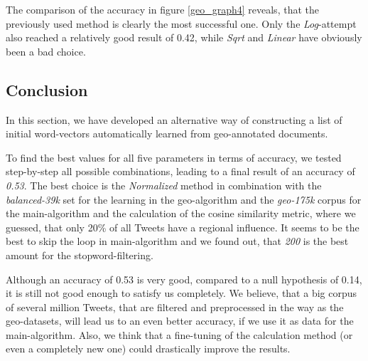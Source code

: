 \documentclass[./Main.tex]{subfiles}
\begin{document}
The comparison of the accuracy in figure \ref{geo_graph4} reveals, that the previously used method is clearly the most successful one. Only the \emph{Log}-attempt also reached a relatively good result of 0.42, while \emph{Sqrt} and \emph{Linear} have obviously been a bad choice. 

\subsection{Conclusion}
In this section, we have developed an alternative way of constructing a list of initial word-vectors automatically learned from geo-annotated documents. 

To find the best values for all five parameters in terms of accuracy, we tested step-by-step all possible combinations,  leading to a final result of an accuracy of \emph{0.53}. The best choice is the \emph{Normalized} method in combination with the \emph{balanced-39k} set for the learning in the geo-algorithm and the \emph{geo-175k} corpus  for the main-algorithm and the calculation of the cosine similarity metric, where we guessed, that only 20\% of all Tweets have a regional influence. It seems to be the best to skip the loop in main-algorithm and we found out, that \emph{200} is the best amount for the stopword-filtering.
 
Although an accuracy of 0.53 is very good, compared to a null hypothesis of 0.14, it is still not good enough to satisfy us completely. We believe, that a big corpus of several million Tweets, that are filtered and preprocessed in the way as the geo-datasets, will lead us to an even better accuracy, if we use it as data for the main-algorithm. Also, we think that a fine-tuning of the calculation method (or even a completely new one) could drastically improve the results. 
\end{document}
